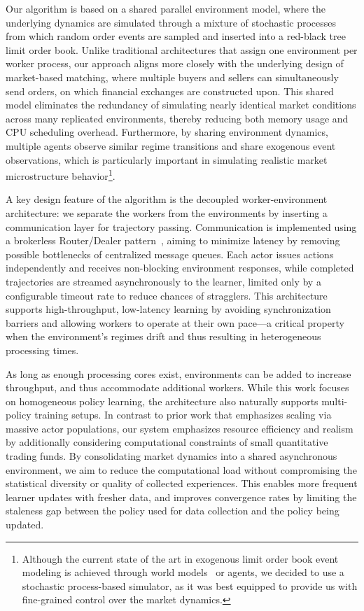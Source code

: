 Our algorithm is based on a shared parallel environment model, where the underlying dynamics are simulated
through a mixture of stochastic processes from which random order events are sampled and inserted into a red-black tree limit order book.
Unlike traditional architectures that assign one environment per worker process,
our approach aligns more closely with the underlying design of market-based matching,
where multiple buyers and sellers can simultaneously send orders, on which financial exchanges are constructed upon.
This shared model eliminates the redundancy of simulating nearly identical market conditions across many replicated environments,
thereby reducing both memory usage and CPU scheduling overhead.
Furthermore, by sharing environment dynamics, multiple agents observe similar regime transitions and share exogenous event observations,
which is particularly important in simulating realistic market microstructure behavior\footnote{
    Although the current state of the art in exogenous limit order book event modeling is achieved through world models~\citep{Coletta2022} or agents,
    we decided to use a stochastic process-based simulator, as it was best equipped to provide us with fine-grained control over the market dynamics.
}.

A key design feature of the algorithm is the decoupled worker-environment architecture:
we separate the workers from the environments by inserting a communication layer for trajectory passing.
Communication is implemented using a brokerless Router/Dealer pattern~\citep{Hintjens2013}, aiming to minimize latency by
removing possible bottlenecks of centralized message queues.
Each actor issues actions independently and receives non-blocking environment responses,
while completed trajectories are streamed asynchronously to the learner,
limited only by a configurable timeout rate to reduce chances of stragglers.
This architecture supports high-throughput, low-latency learning by avoiding synchronization barriers and
allowing workers to operate at their own pace---a critical property when the environment's regimes drift and
thus resulting in heterogeneous processing times.

As long as enough processing cores exist, environments can be added to increase throughput, and thus accommodate additional workers.
While this work focuses on homogeneous policy learning, the architecture also naturally supports multi-policy training setups.
In contrast to prior work that emphasizes scaling via massive actor populations,
our system emphasizes resource efficiency and realism by additionally considering computational constraints of small quantitative trading funds.
By consolidating market dynamics into a shared asynchronous environment,
we aim to reduce the computational load without compromising the statistical diversity or quality of collected experiences.
This enables more frequent learner updates with fresher data, and improves convergence rates by limiting the staleness gap
between the policy used for data collection and the policy being updated.

